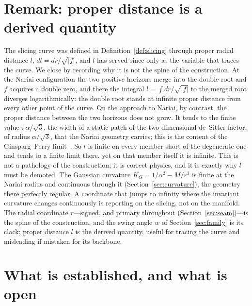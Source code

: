\documentclass[11pt,a4paper]{article}
\theoremstyle{definition}
\begin{document}
\section{Remark: proper distance is a derived quantity}\label{sec:remark}

The slicing curve was defined in Definition~\ref{def:slicing} through proper radial distance $l$, $dl=dr/\sqrt{|f|}$, and $l$ has served since only as the variable that traces the curve. We close by recording why it is not the spine of the construction. At the Nariai configuration the two positive horizons merge into the double root and $f$ acquires a double zero, and there the integral $l=\int dr/\sqrt{|f|}$ to the merged root diverges logarithmically: the double root stands at infinite proper distance from every other point of the curve. On the approach to Nariai, by contrast, the proper distance between the two horizons does not grow. It tends to the finite value $\pi\alpha/\sqrt3$, the width of a static patch of the two-dimensional de~Sitter factor, of radius $\alpha/\sqrt3$, that the Nariai geometry carries; this is the content of the Ginsparg--Perry limit~\cite{GinspargPerry1983,Podolsky1999}. So $l$ is finite on every member short of the degenerate one and tends to a finite limit there, yet on that member itself it is infinite. This is not a pathology of the construction; it is correct physics, and it is exactly why $l$ must be demoted. The Gaussian curvature $K_{G}=1/\alpha^{2}-M/r^{3}$ is finite at the Nariai radius and continuous through it (Section~\ref{sec:curvature}), the geometry there perfectly regular. A coordinate that jumps to infinity where the invariant curvature changes continuously is reporting on the slicing, not on the manifold. The radial coordinate $r$---signed, and primary throughout (Section~\ref{sec:seam})---is the spine of the construction, and the swing angle $w$ of Section~\ref{sec:family} is its clock; proper distance $l$ is the derived quantity, useful for tracing the curve and misleading if mistaken for its backbone.

\section{What is established, and what is open}
\end{document}
